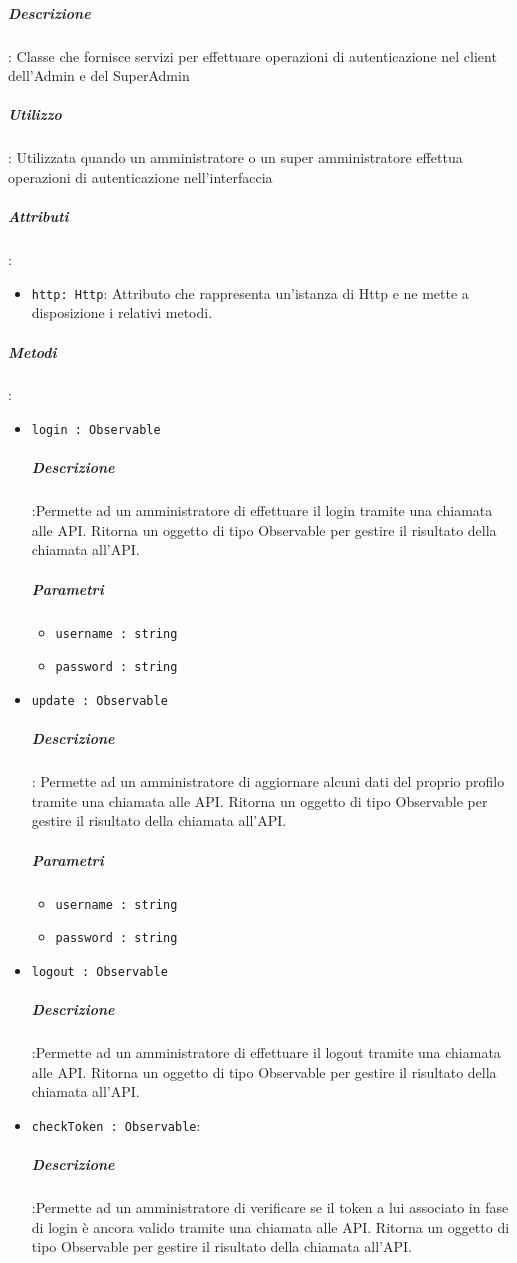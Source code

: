 \documentclass[../DefinizioneDiProdotto_v2.0.0.tex]{subfiles}
\begin{document}
				\subparagraph{Descrizione}: Classe che fornisce servizi per effettuare operazioni di autenticazione nel client dell'Admin e del SuperAdmin
				\subparagraph{Utilizzo}: Utilizzata quando un amministratore o un super amministratore effettua operazioni di autenticazione nell'interfaccia
				\subparagraph{Attributi}:
				\begin{itemize}
					\item \texttt{http: Http}: Attributo che rappresenta un'istanza di Http e ne mette a disposizione i relativi metodi.
				\end{itemize}
				\subparagraph{Metodi}:
				\begin{itemize}
					\item \texttt{login : Observable}
					\subparagraph{Descrizione}:Permette ad un amministratore di effettuare il login tramite una chiamata alle API. Ritorna un oggetto di tipo Observable per gestire il risultato della chiamata all'API.
					\subparagraph{Parametri}\begin{itemize}
						\item \texttt{username : string}
						\item \texttt{password : string}
					\end{itemize}

					\item \texttt{update : Observable}
					\subparagraph{Descrizione}: Permette ad un amministratore di aggiornare alcuni dati del proprio profilo tramite una chiamata alle API. Ritorna un oggetto di tipo Observable per gestire il risultato della chiamata all'API.
					\subparagraph{Parametri}\begin{itemize}
						\item \texttt{username : string}
						\item \texttt{password : string}
					\end{itemize}
					\item \texttt{logout : Observable}
					\subparagraph{Descrizione}:Permette ad un amministratore di effettuare il logout tramite una chiamata alle API. Ritorna un oggetto di tipo Observable per gestire il risultato della chiamata all'API.

					\item \texttt{checkToken : Observable}:
					\subparagraph{Descrizione}:Permette ad un amministratore di verificare se il token a lui associato in fase di login è ancora valido tramite una chiamata alle API. Ritorna un oggetto di tipo Observable per gestire il risultato della chiamata all'API.
				\end{itemize}
\end{document}
